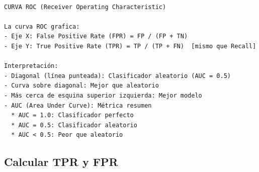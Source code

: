 \documentclass[
  doc,
  floatsintext,
  longtable,
  a4paper,
  nolmodern,
  notxfonts,
  notimes,
  12pt,
  colorlinks=true,linkcolor=blue,citecolor=blue,urlcolor=blue]{apa7}
\begin{document}
\begin{verbatim}

CURVA ROC (Receiver Operating Characteristic)

La curva ROC grafica:
- Eje X: False Positive Rate (FPR) = FP / (FP + TN)
- Eje Y: True Positive Rate (TPR) = TP / (TP + FN)  [mismo que Recall]

Interpretación:
- Diagonal (línea punteada): Clasificador aleatorio (AUC = 0.5)
- Curva sobre diagonal: Mejor que aleatorio
- Más cerca de esquina superior izquierda: Mejor modelo
- AUC (Area Under Curve): Métrica resumen
  * AUC = 1.0: Clasificador perfecto
  * AUC = 0.5: Clasificador aleatorio
  * AUC < 0.5: Peor que aleatorio
\end{verbatim}

\subsection{Calcular TPR y FPR}\label{calcular-tpr-y-fpr}
\end{document}
